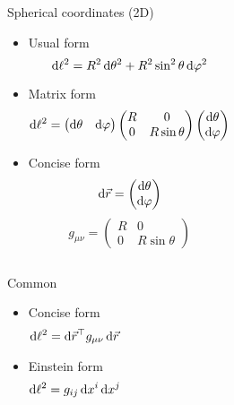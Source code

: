 \documentclass[mathserif]{beamer}
\begin{document}
\begin{frame}
\newcommand\sphericaliiDcoordinatesblock{
\begin{block}{Spherical coordinates (2D)}
\begin{itemize}
\item Usual form
$$\dif \ell^2 = R^2\dif\theta^2 + R^2\sin^2\theta\dif\varphi^2$$
\item Matrix form
$$\dif \ell^2 =
\begin{pmatrix}\dif\theta&\dif\varphi\end{pmatrix}
\begin{pmatrix}R&0\\0&R\sin\theta\end{pmatrix}
\begin{pmatrix}\dif\theta\\\dif\varphi\end{pmatrix}
$$
\item Concise form
$$\dif\vec r=\begin{pmatrix}\dif\theta\\\dif\varphi\end{pmatrix}$$
$$g_{\mu\nu}=\begin{pmatrix}R&0\\0&R\sin\theta\end{pmatrix}$$
\end{itemize}
\end{block}
}

\begin{columns}[c]
\euclideancoordinatesblock
{}
\polarcoordinatesblock
{}
\sphericaliiDcoordinatesblock
\end{columns}

\begin{columns}[c]
\begin{block}{Common}
\begin{itemize}
\item Concise form
$$\dif \ell^2 = \dif\vec r^\top g_{\mu\nu} \dif\vec r $$
\item Einstein form
$$\dif \ell^2 = g_{ij}\dif x^i\dif x^j$$
\end{itemize}
\end{block}
\end{columns}

\end{frame}
\end{document}
